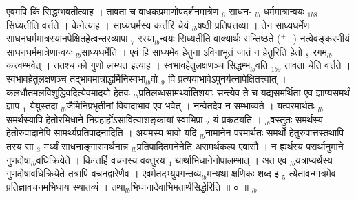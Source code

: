 \documentclass[article,12pt,a4paper]{memoir}%
\newcommand{\add}[1]{($^{+}$#1)}
\newcounter{parCount}
\begin{document}
	  
	  \pstart \leavevmode%
	\hphantom{.}एवमपि किं सिद्धम्भवतीत्याह । {\color{DodgerBlue3}तावता} च वाधकप्रमाणोपदर्शनमात्रेण {\tiny $_{6}$} {\color{DodgerBlue3}साधन-} {\tiny $_{lb}$} \leavevmode{} {\color{DodgerBlue3}धर्ममात्रान्वयः} {\tiny $_{1b8}$} सिध्यतीति वर्त्तते । केनेत्याह । साध्यधर्मस्य कर्त्तरि चेयं {\tiny $_{lb}$}षष्ठी प्रतिपत्तव्या । तेन साध्यधर्मेण साधनधर्ममात्रस्यानपेक्षितहेत्वन्तरव्यापा {\tiny $_{7}$} रस्या{\tiny $_{lb}$}न्वयः सिध्यतीति वाक्यार्थः सन्तिष्ठते \add{।} नत्वेवङ्करणीयं साधनधर्ममात्रेणान्वयः {\tiny $_{lb}$}साध्यधर्मेति । एवं हि साध्यमेव हेतुना ऽविनाभूतं जातं न हेतुरिति हेतो {\tiny $_{8}$} रगम{\tiny $_{lb}$}कत्त्वम्भवेत् । ततश्च को गुणो लभ्यत इत्याह । {\color{DodgerBlue3}स्वभावहेतुलक्षणञ्च सिद्धम्भ{\tiny $_{lb}$}वति} {\tiny $_{1b9}$} तावता चेति वर्त्तते । स्वभावहेतुलक्षणञ्च तद्भावमात्राद्धर्मिनिस्वभा{\tiny $_{lb}$}वो {\tiny $_{9}$} \leavevmode{} पि प्रत्ययाभावेऽपुनर्यत्नापेक्षितत्त्वात् । कलधौतमलविशुद्धिवदित्येवमादयो हेतवः {\tiny $_{lb}$}प्रतिलब्धसामर्थ्यातिशयाः सन्त्येव ते च यद्यसमर्थिता एव ज्ञाप्यसमर्थं ज्ञाप {\tiny $_{1}$} येयुस्तदा {\tiny $_{lb}$}जैमिनिप्रभृतीनां विवादाभाव एव भवेत् । नन्वेतदेव न सम्भाव्यते । यत्परमार्थतः {\tiny $_{lb}$}समर्थस्यापि हेतोरभिधाने निग्रहार्होऽसावित्याशङ्कायां स्वाभिप्रा {\tiny $_{2}$} यं प्रकटयति । {\tiny $_{lb}$}वस्तुतः समर्थस्य हेतोरुपादानेपि सामर्थ्यप्रतिपादनादिति । अयमस्य भावो यदि {\tiny $_{lb}$}नामानेन परमार्थतः समर्थो हेतुरुपात्तस्तथापि तस्य सा {\tiny $_{3}$} मर्थ्यं {\color{DodgerBlue3}साधनाङ्गासमर्थनान्न} {\tiny $_{lb}$}प्रतिपादितमनेनेति असमर्थकल्प एवासौ । न ह्यर्थस्य परार्थानुमाने गुणदोषा{\tiny $_{lb}$}वधिक्रियेते । किन्तर्हि वचनस्य वक्तुरय {\tiny $_{4}$} थार्थाभिधानेनोपालम्भात् । अत एव {\tiny $_{lb}$}यत्राप्यर्थस्य गुणदोषावधिक्रियेते तत्रापि वचनद्वारेणैव । एवमेतदभ्युपगन्तव्य{\tiny $_{lb}$}मन्यथा क्षणिकः शब्द इ {\tiny $_{5}$} त्येतावन्मात्रमेव प्रतिज्ञावचनमभिधाय स्थातव्यं । तथा{\tiny $_{lb}$}भिधानादेवाभिमतार्थसिद्धेरिति ॥ ० ॥
	{}
	\pend%
      {\tiny $_{lb}$}
\end{document}
